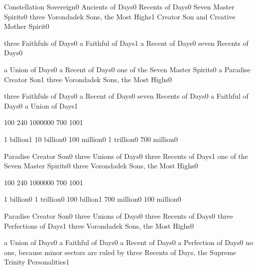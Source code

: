 {Constellation Sovereign}{0}
{Ancients of Days}{0}
{Recents of Days}{0}
{Seven Master Spirits}{0}
{three Vorondadek Sons, the Most Highs}{1}
{Creator Son and Creative Mother Spirit}{0}
\qstop

{three Faithfuls of Days}{0}
{a Faithful of Days}{1}
{a Recent of Days}{0}
{seven Recents of Days}{0}
\qstop

{a Union of Days}{0}
{a Recent of Days}{0}
{one of the Seven Master Spirits}{0}
{a Paradise Creator Son}{1}
{three Vorondadek Sons, the Most Highs}{0}
\qstop

{three Faithfuls of Days}{0}
{a Recent of Days}{0}
{seven Recents of Days}{0}
{a Faithful of Days}{0}
{a Union of Days}{1}
\qstop

{10}{0}
{24}{0}
{100000}{0}
{70}{0}
{100}{1}
\qstop

{1 billion}{1}
{10 billion}{0}
{100 million}{0}
{1 trillion}{0}
{700 million}{0}
\qstop

{Paradise Creator Son}{0}
{three Unions of Days}{0}
{three Recents of Days}{1}
{one of the Seven Master Spirits}{0}
{three Vorondadek Sons, the Most Highs}{0}
\qstop

{10}{0}
{24}{0}
{100000}{0}
{70}{0}
{100}{1}
\qstop

{1 billion}{0}
{1 trillion}{0}
{100 billion}{1}
{700 million}{0}
{100 million}{0}
\qstop

{Paradise Creator Son}{0}
{three Unions of Days}{0}
{three Recents of Days}{0}
{three Perfections of Days}{1}
{three Vorondadek Sons, the Most Highs}{0}
\qstop

{a Union of Days}{0}
{a Faithful of Days}{0}
{a Recent of Days}{0}
{a Perfection of Days}{0}
{no one, because minor sectors are ruled by three Recents of Days, the Supreme Trinity Personalities}{1}
\qstop

